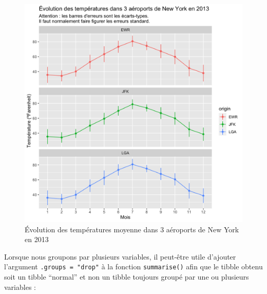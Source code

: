 \documentclass[
  a4paper,
]{article}
\newenvironment{Shaded}{\begin{snugshade}}{\end{snugshade}}
\newcommand{\DataTypeTok}[1]{\textcolor[rgb]{0.00,0.34,0.68}{#1}}
\newcommand{\KeywordTok}[1]{\textcolor[rgb]{0.12,0.11,0.11}{\textbf{#1}}}
\newcommand{\NormalTok}[1]{\textcolor[rgb]{0.12,0.11,0.11}{#1}}
\newcommand{\OperatorTok}[1]{\textcolor[rgb]{0.12,0.11,0.11}{#1}}
\newcommand{\OtherTok}[1]{\textcolor[rgb]{0.00,0.43,0.16}{#1}}
\newcommand{\StringTok}[1]{\textcolor[rgb]{0.75,0.01,0.01}{#1}}
\begin{document}
\begin{figure}[htpb]

{\centering \includegraphics[width=0.9\linewidth]{figure/errorbars4-1} 

}

\caption{Évolution des températures moyenne dans 3 aéroports de New York en 2013}\label{fig:errorbars4}
\end{figure}

Lorsque nous groupons par plusieurs variables, il peut-être utile d'ajouter l'argument \texttt{.groups\ =\ "drop"} à la fonction \texttt{summarise()} afin que le tibble obtenu soit un tibble ``normal'' et non un tibble toujours groupé par une ou plusieurs variables :

\begin{Shaded}
\end{Shaded}
\end{document}
